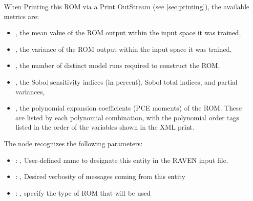   When Printing this ROM via a Print OutStream (see \ref{sec:printing}), the available metrics are:
  \begin{itemize}                           \item {}, the mean value of the ROM output
  within the input space it was trained,                           \item {}, the
  variance of the ROM output within the input space it was trained,                           \item
  , the number of distinct model runs required to construct the ROM,
  \item {}, the Sobol sensitivity indices (in percent), Sobol total indices, and
  partial variances,                           \item {}, the polynomial
  expansion coefficients (PCE moments) of the ROM.  These are                             listed by
  each polynomial combination, with the polynomial order tags listed in the order of the variables
  shown in the XML print.                         \end{itemize}

  The  node recognizes the following parameters:
    \begin{itemize}
      \item {}: , 
        User-defined name to designate this entity in the RAVEN input file.
      \item {}: , 
        Desired verbosity of messages coming from this entity
      \item {}: , 
        specify the type of ROM that will be used
  \end{itemize}

